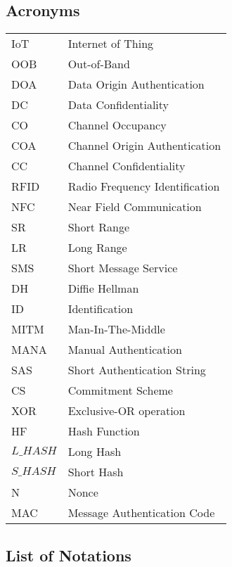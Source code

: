 \subsection*{Acronyms}

\begin{longtable}[l]{p{50pt} p{200pt}} 

IoT & Internet of Thing \\
OOB & Out-of-Band \\ 
DOA & Data Origin Authentication \\ 
DC & Data Confidentiality  \\
CO & Channel Occupancy  \\
COA & Channel Origin Authentication  \\
CC & Channel Confidentiality  \\
RFID & Radio Frequency Identification \\
NFC & Near Field Communication \\
SR & Short Range \\
LR & Long Range \\
SMS & Short Message Service \\
DH &  Diffie Hellman \\
ID & Identification \\
MITM & Man-In-The-Middle \\
MANA & Manual Authentication \\
SAS & Short Authentication String \\
CS & Commitment Scheme \\
XOR & Exclusive-OR operation \\ 
HF & Hash Function \\
$L\_HASH$ & Long Hash \\
$S\_HASH$ & Short Hash \\
N & Nonce \\
MAC &  Message Authentication Code \\
\end{longtable} 

\subsection*{List of Notations}

